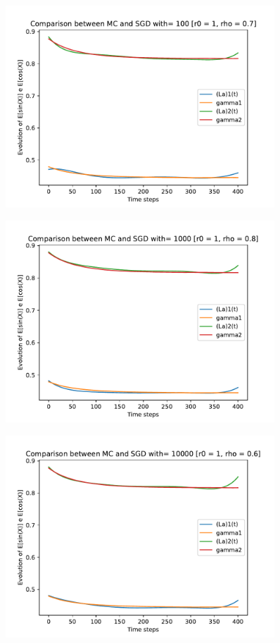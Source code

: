 \documentclass[a4paper,11pt,openright]{report}
\begin{document}
\begin{figure}[H]
\centering
\includegraphics[width=0.9\textwidth]{images/graphics T = 4/n = 6, M = 100 sine and cosine.pdf}
\end{figure}
\begin{figure}[H]
\centering
\includegraphics[width=0.9\textwidth]{images/graphics T = 4/n = 6, M = 1000 sine and cosine.pdf}
\end{figure}
\begin{figure}[H]
\centering
\includegraphics[width=0.9\textwidth]{images/graphics T = 4/n = 6, M = 10000 sine and cosine.pdf}
\end{figure}
\newpage
\end{document}
